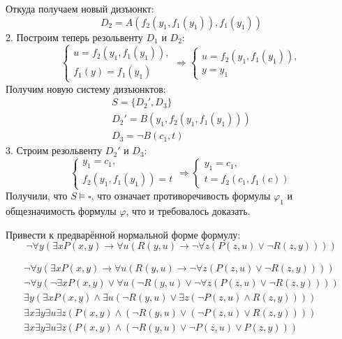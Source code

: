 \documentclass[11pt]{article}
\newcounter{th}\setcounter{th}{0}
\begin{document}
Откуда получаем новый дизъюнкт:
\begin{equation*}
D_2 = A(f_2(y_1, f_1(y_1)), f_1(y_1))
\end{equation*}
2. Построим теперь резольвенту $D_1$ и $D_2$:
\begin{equation*}
\begin{cases}
u = f_2(y_1, f_1(y_1)), \\
f_1(y) = f_1(y_1)
\end{cases}
\Rightarrow
\begin{cases}
u = f_2(y_1, f_1(y_1)), \\
y = y_1
\end{cases}
\end{equation*}
Получим новую систему дизъюнктов:
\begin{gather*}
S = \{D_2', D_3\} \\
D_2' = B(y_1, f_2(y_1, f_1(y_1))) \\
D_3 = \lnot B(c_1, t)
\end{gather*}
3. Строим резольвенту $D_2'$ и $D_3$:
\begin{equation*}
\begin{cases}
y_1 = c_1, \\
f_2(y_1, f_1(y_1)) = t
\end{cases}
\Rightarrow
\begin{cases}
y_1 = c_1, \\
t = f_2(c_1, f_1(c))
\end{cases}
\end{equation*}
Получили, что $S \models \square$, что означает противоречивость формулы $\varphi_1$ и общезначимость формулы $\varphi$, что и требовалось доказать.

Привести к предварённой нормальной форме формулу:
\begin{equation*}
\lnot \forall y (\exists x P(x, y) \to \forall u (R(y, u) \to \lnot\forall z(P(z, u) \lor \lnot R(z, y))))
\end{equation*}

\begin{gather*}
\lnot \forall y (\exists x P(x, y) \to \forall u (R(y, u) \to \lnot\forall z(P(z, u) \lor \lnot R(z, y)))) \\
\lnot \forall y (\lnot \exists x P(x, y) \lor \forall u (\lnot R(y, u) \lor \lnot \forall z (P(z, u) \lor \lnot R(z, y)))) \\
\exists y (\exists x P(x, y) \land \exists u (\lnot R(y, u) \lor \exists z (\lnot P(z, u) \land R(z, y)))) \\
\exists x \exists y \exists u \exists z (P(x, y) \land (\lnot R(y, u) \lor (\lnot P(z, u) \lor R(z, y)))) \\
\exists x \exists y \exists u \exists z (P(x, y) \land (\lnot R(y, u) \lor \lnot P(z, u) \lor P(z, y)))
\end{gather*}
\end{document}
